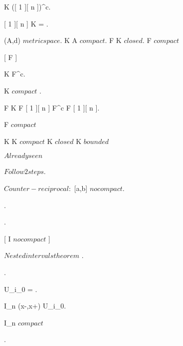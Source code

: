 {{{{			K \subset ([ 1 ][ n ])^c.

			[ 1 ][ n ] \cap K = \emptyset.

		}
	}}



	{
	{
		(A,d) $ metric space $.
		K \subset A $ compact $.
		F \subset K $ closed $.
	}
	\holds
	{
		F $ compact $
	}
	\demonstration
	{
		[ F \subset {} ]
		{
			K \subset {} \cup F^c.

			K $ compact $ \imp {}.

			F \subset K \imp F \subset {}[ 1 ][ n ] \cup F^c \imp F \subset {}[ 1 ][ n ].
		}

		F $ compact $
	}}



	{
	{
		K \subset \R
	}
	\holds
	{
		K $ compact $ \ifandonlyif K $ closed $ \logicand K $ bounded $
	}
	\demonstration
	{
		\rightway
		{
			$ Already seen$
		}
		\leftway
		{
			$ Follow 2 steps $.
			
			{
				$ Counter-reciprocal: $ [a,b] $ no compact $.

				.

				.

				{
				 	[ I $ no compact $ ] 
				} 

				$ Nested intervals theorem $ \imp {}.

				.

				U_{i_0} =  \imp {}.

				 \imp I_n \subset (x-\delta,x+\delta) \subset U_{i_0}.

				I_n $ compact $
			}.
			
}}}}
